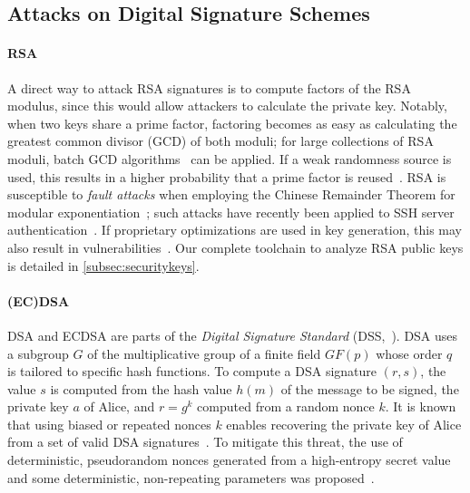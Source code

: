 \label{sec:background}

\subsection{Attacks on Digital Signature Schemes}
\label{sec:background:sub:dssattacks}

\paragraph{RSA}

A direct way to attack RSA signatures is to compute factors of the RSA modulus, since this would allow attackers to calculate the private key. Notably, when two keys share a prime factor, factoring becomes as easy as calculating the greatest common divisor (GCD) of both moduli; for large collections of RSA moduli, batch GCD algorithms~\cite{bernstein2004find} can be applied. If a weak randomness source is used, this results in a higher probability that a prime factor is reused~\cite{yilek2009private}. RSA is susceptible to \emph{fault attacks} when employing the Chinese Remainder Theorem for modular exponentiation~\cite{JC:BonDeMLip01,CHES:ABFHS02}; such attacks have recently been applied to SSH server authentication~\cite{CCS:RHSH23}. If proprietary optimizations are used in key generation, this may also result in vulnerabilities~\cite{CCS:NSSKM17}. Our complete toolchain to analyze RSA public keys is detailed in \autoref{subsec:securitykeys}.

\paragraph{(EC)DSA}

DSA and ECDSA are parts of the \emph{Digital Signature Standard} (DSS,~\cite{FIPS-186-4,FIPS-186-5}). DSA uses a subgroup $G$ of the multiplicative group of a finite field $GF(p)$ whose order $q$ is tailored to specific hash functions. To compute a DSA signature $(r,s)$, the value $s$ is computed from the hash value $h(m)$ of the message to be signed, the private key $a$ of Alice, and $r=g^k$ computed from a random nonce $k$. It is known that using biased or repeated nonces $k$ enables recovering the private key of Alice from a set of valid DSA signatures~\cite{FC:BreHen19}. To mitigate this threat, the use of deterministic, pseudorandom nonces generated from a high-entropy secret value and some deterministic, non-repeating parameters was proposed~\cite{rfc6979}.

